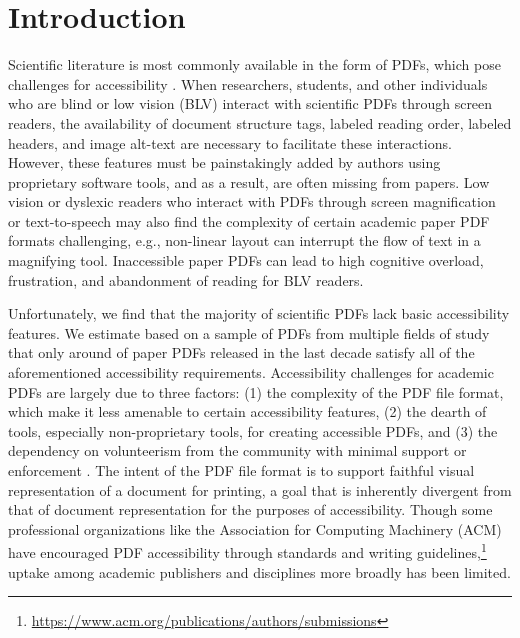 \section{Introduction}

Scientific literature is most commonly available in the form of PDFs, which pose challenges for accessibility \citep{NielsenPDFStillUnfit, Bigham2016AnUT}. When researchers, students, and other individuals who are blind or low vision (BLV) interact with scientific PDFs through screen readers, the availability of document structure tags, labeled reading order, labeled headers, and image alt-text are necessary to facilitate these interactions. However, these features must be painstakingly added by authors using proprietary software tools, and as a result, are often missing from papers. Low vision or dyslexic readers who interact with PDFs through screen magnification or text-to-speech may also find the complexity of certain academic paper PDF formats challenging, e.g., non-linear layout can interrupt the flow of text in a magnifying tool. Inaccessible paper PDFs can lead to high cognitive overload, frustration, and abandonment of reading for BLV readers. 

Unfortunately, we find that the majority of scientific PDFs lack basic accessibility features. We estimate based on a sample of \numpdfs PDFs from multiple fields of study that only around \percaccessible of paper PDFs released in the last decade satisfy all of the aforementioned accessibility requirements. 
Accessibility challenges for academic PDFs are largely due to three factors: (1) the complexity of the PDF file format, which make it less amenable to certain accessibility features, (2) the dearth of tools, especially non-proprietary tools, for creating accessible PDFs, and (3) the dependency on volunteerism from the community with minimal support or enforcement \citep{Bigham2016AnUT}. The intent of the PDF file format is to support faithful visual representation of a document for printing, a goal that is inherently divergent from that of document representation for the purposes of accessibility. Though some professional organizations like the Association for Computing Machinery (ACM) have encouraged PDF accessibility through standards and writing guidelines,\footnote{\href{https://www.acm.org/publications/authors/submissions}{https://www.acm.org/publications/authors/submissions}} uptake among academic publishers and disciplines more broadly has been limited. 

